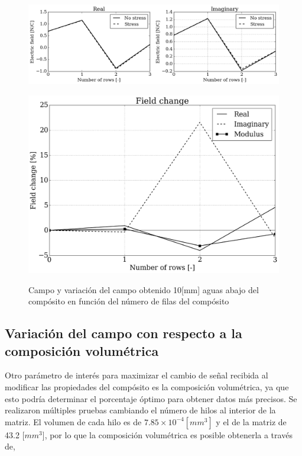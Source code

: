 \documentclass[12pt,letterpaper]{article}
\numberwithin{equation}{section}
\begin{document}
\begin{figure}[H]
	\centering\includegraphics[scale=0.6]{Imagenes/block_comparision.png}\\
\end{figure} 
\begin{figure}[H]
	\centering\includegraphics[scale=0.35]{Imagenes/block_change.png}\\
	\caption{Campo y variación del campo obtenido 10[mm] aguas abajo del compósito en función del número de filas del compósito}
	\label{fig:fieldblockchange}
\end{figure}

\subsection{Variación del campo con respecto a la composición volumétrica}
Otro parámetro de interés para maximizar el cambio de señal recibida al modificar las propiedades del compósito es la composición volumétrica, ya que esto podría determinar el porcentaje óptimo para obtener datos más precisos.
Se realizaron múltiples pruebas cambiando el número de hilos al interior de la matriz. El volumen de cada hilo es de $7.85\times 10^{-4}[mm^3]$ y el de la matriz de 43.2 [$mm^3$], por lo que la composición volumétrica es posible obtenerla a través de,
\end{document}
